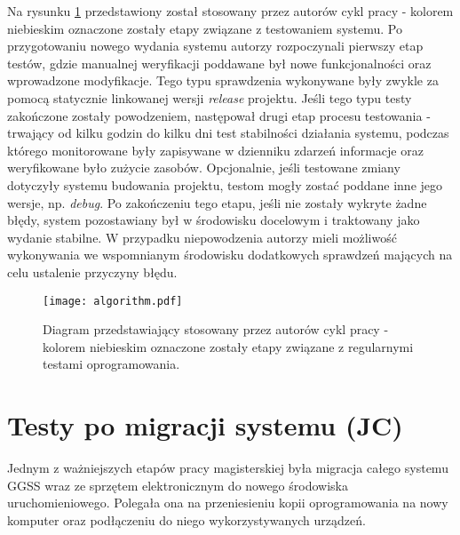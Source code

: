 \clearpage
Na rysunku \ref{fig:tests_1} przedstawiony został stosowany przez autorów cykl pracy - kolorem niebieskim oznaczone zostały etapy związane z testowaniem systemu. Po przygotowaniu nowego wydania systemu autorzy rozpoczynali pierwszy etap testów, gdzie manualnej weryfikacji poddawane był nowe funkcjonalności oraz wprowadzone modyfikacje. Tego typu sprawdzenia wykonywane były zwykle za pomocą statycznie linkowanej wersji \emph{release} projektu. Jeśli tego typu testy zakończone zostały powodzeniem, następował drugi etap procesu testowania - trwający od kilku godzin do kilku dni test stabilności działania systemu, podczas którego monitorowane były zapisywane w dzienniku zdarzeń informacje oraz weryfikowane było zużycie zasobów. Opcjonalnie, jeśli testowane zmiany dotyczyły systemu budowania projektu, testom mogły zostać poddane inne jego wersje, np. \emph{debug}. Po zakończeniu tego etapu, jeśli nie zostały wykryte żadne błędy, system pozostawiany był w środowisku docelowym i traktowany jako wydanie stabilne. W przypadku niepowodzenia autorzy mieli możliwość wykonywania we wspomnianym środowisku dodatkowych sprawdzeń mających na celu ustalenie przyczyny błędu.

\begin{figure}[H]
\centering
\texttt{[image: algorithm.pdf]}
\caption{Diagram przedstawiający stosowany przez autorów cykl pracy - kolorem niebieskim oznaczone zostały etapy związane z regularnymi testami oprogramowania.}
\label{fig:tests_1}
\end{figure}

\section{Testy po migracji systemu (JC)}

Jednym z ważniejszych etapów pracy magisterskiej była migracja całego systemu GGSS wraz ze sprzętem elektronicznym do nowego środowiska uruchomieniowego. Polegała ona na przeniesieniu kopii oprogramowania na nowy komputer oraz podłączeniu do niego wykorzystywanych urządzeń.

